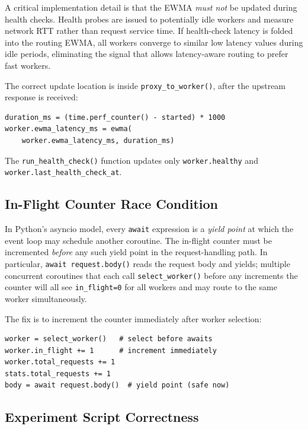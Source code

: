 \documentclass[conference]{IEEEtran}
\begin{document}
A critical implementation detail is that the EWMA \emph{must not} be
updated during health checks. Health probes are issued to potentially
idle workers and measure network RTT rather than request service time.
If health-check latency is folded into the routing EWMA, all workers
converge to similar low latency values during idle periods, eliminating
the signal that allows latency-aware routing to prefer fast workers.

The correct update location is inside \texttt{proxy\_to\_worker()},
after the upstream response is received:

\begin{lstlisting}
duration_ms = (time.perf_counter() - started) * 1000
worker.ewma_latency_ms = ewma(
    worker.ewma_latency_ms, duration_ms)
\end{lstlisting}

The \texttt{run\_health\_check()} function updates only
\texttt{worker.healthy} and \texttt{worker.last\_health\_check\_at}.

\subsection{In-Flight Counter Race Condition}

In Python's asyncio model, every \texttt{await} expression is a
\emph{yield point} at which the event loop may schedule another
coroutine. The in-flight counter must be incremented \emph{before} any
such yield point in the request-handling path. In particular,
\texttt{await request.body()} reads the request body and yields;
multiple concurrent coroutines that each call \texttt{select\_worker()}
before any increments the counter will all see \texttt{in\_flight=0}
for all workers and may route to the same worker simultaneously.

The fix is to increment the counter immediately after worker selection:

\begin{lstlisting}
worker = select_worker()   # select before awaits
worker.in_flight += 1      # increment immediately
worker.total_requests += 1
stats.total_requests += 1
body = await request.body()  # yield point (safe now)
\end{lstlisting}

\subsection{Experiment Script Correctness}
\end{document}
